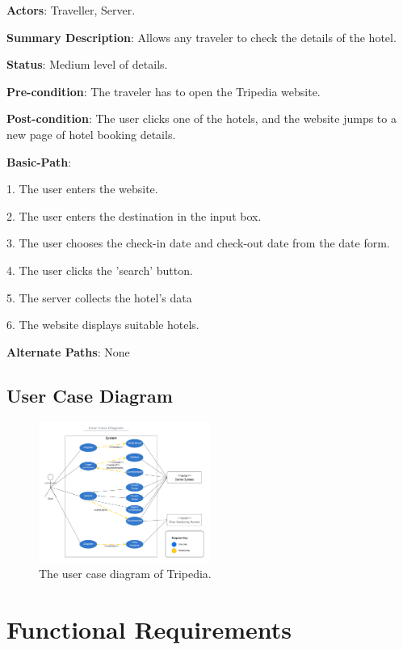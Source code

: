 \documentclass[conference]{IEEEtran}
\begin{document}
\textbf{Actors}: Traveller, Server.

\textbf{Summary Description}: Allows any traveler to check the details of the hotel.

\textbf{Status}: Medium level of details.

\textbf{Pre-condition}: The traveler has to open the Tripedia website.

\textbf{Post-condition}: The user clicks one of the hotels, and the website jumps to a new page of hotel booking details.

\textbf{Basic-Path}:

1. The user enters the website.

2. The user enters the destination in the input box.

3. The user chooses the check-in date and check-out date from the date form.

4. The user clicks the 'search' button.

5. The server collects the hotel's data

6. The website displays suitable hotels.

\textbf{Alternate Paths}: None



\subsection{User Case Diagram}


\begin{figure}[htbp]
\centerline{\includegraphics[width=0.5\textwidth]{UserCaseDiagram.pdf}}
\caption{The user case diagram of Tripedia.}
\label{fig2}
\end{figure}



\section{Functional Requirements}
\end{document}
